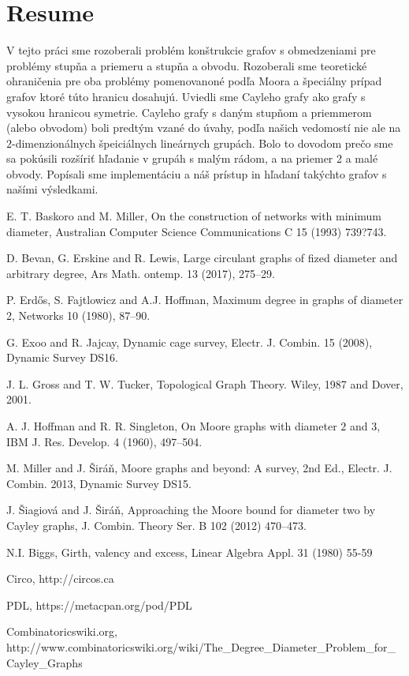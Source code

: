 \documentclass[a4paper,12pt,oneside]{report}%
\begin{document}
\section{Resume}
V tejto pr\'aci sme rozoberali probl\'em kon\v{s}trukcie grafov s obmedzeniami pre probl\'emy stup\v{n}a a priemeru a stup\v{n}a a obvodu. Rozoberali sme teoretick\'e ohrani\v{c}enia pre oba probl\'emy pomenovanon\'e pod\v{l}a Moora a \v{s}peci\'alny pr\'ipad grafov ktor\'e t\'uto hranicu dosahuj\'u. Uviedli sme Cayleho grafy ako grafy s vysokou hranicou symetrie. Cayleho grafy s dan\'ym stup\v{n}om a priemmerom (alebo obvodom) boli predt\'ym vzan\'e do \'uvahy, pod\v{l}a na\v{s}ich vedomost\'i nie ale na $2$-dimenzion\'alnych \v{s}peici\'alnych line\'arnych grup\'ach. Bolo to dovodom pre\v{c}o sme sa pok\'usili roz\v{s}\'iri\v{t} h\v{l}adanie v grup\'ah s mal\'ym r\'adom, a na priemer 2 a mal\'e obvody. Pop\'isali sme implement\'aciu a n\'a\v{s} pr\'istup in h\v{l}adan\'i tak\'ychto grafov s na\v{s}\'imi v\'ysledkami.

\begin{thebibliography}{xx}

 E. T. Baskoro and M. Miller, On the construction of networks with minimum diameter,
Australian Computer Science Communications C 15 (1993) 739?743.

 D. Bevan, G. Erskine and R. Lewis, Large circulant graphs of fized diameter and arbitrary degree, Ars Math. ontemp. 13 (2017), 275--29.

 P. Erd{\H o}s, S. Fajtlowicz and A.J. Hoffman,
Maximum degree in graphs of diameter 2, Networks 10
(1980), 87--90.

 G. Exoo and R. Jajcay, Dynamic cage survey, Electr. J. Combin. 15 (2008), Dynamic Survey DS16.

 J. L. Gross and T. W. Tucker, Topological Graph Theory. Wiley, 1987 and Dover, 2001.

 A. J. Hoffman and R. R. Singleton, On Moore graphs with diameter $2$ and $3$, IBM J. Res. Develop. 4 (1960), 497--504.

 M. Miller and J. \v{S}ir\'a\v{n},  Moore graphs and beyond: A survey, 2nd Ed., Electr. J. Combin. 2013, Dynamic Survey DS15.

 J. \v{S}iagiov\'a and J. \v{S}ir\'a\v{n}, Approaching the Moore bound for diameter two by Cayley graphs, J. Combin. Theory Ser. B 102 (2012) 470--473.

 N.I. Biggs, Girth, valency and excess, Linear Algebra Appl. 31 (1980) 55-59

 Circo, http://circos.ca

 PDL, https://metacpan.org/pod/PDL

 Combinatoricswiki.org, http://www.combinatoricswiki.org/wiki/The\_Degree\_Diameter\_Problem\_for\_Cayley\_Graphs 

\end{thebibliography}
\end{document}
